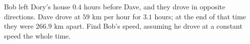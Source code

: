 Bob left Dory's house $0.4$ hours before Dave, and they drove in opposite directions. Dave drove at $59$ km per hour for $3.1$ hours; at the end of that time they were $266.9$ km apart. Find Bob's speed, assuming he drove at a constant speed the whole time.
